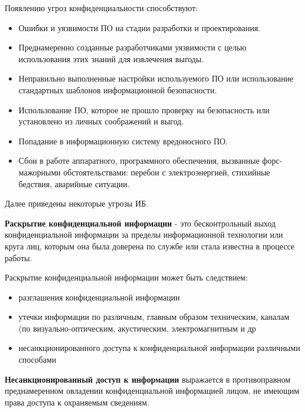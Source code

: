 Появлению угроз конфиденциальности способствуют: 
\begin{itemize}


    \item Ошибки и уязвимости ПО на стадии разработки и проектирования.

    \item Преднамеренно созданные разработчиками уязвимости с целью использования этих знаний для извлечения выгоды.

    \item Неправильно выполненные настройки используемого ПО или использование стандартных шаблонов информационной безопасности.

    \item Использование ПО, которое не прошло проверку на безопасность или установлено из личных соображений и выгод.

    \item Попадание в информационную систему вредоносного ПО.

    \item Сбои в работе аппаратного, программного обеспечения, вызванные форс-мажорными обстоятельствами: перебои с электроэнергией, стихийные бедствия, аварийные ситуации.

\end{itemize}

Далее приведены некоторые угрозы ИБ.

\textbf{Раскрытие конфиденциальной информации} - это бесконтрольный выход конфиденциальной
информации за пределы информационной технологии или круга лиц, которым она была доверена по
службе или стала известна в процессе работы.

Раскрытие конфиденциальной информации может быть следствием:
\begin{itemize}
    \item разглашения конфиденциальной информации
    \item утечки информации по различным, главным образом техническим, каналам
        (по визуально-оптическим, акустическим, электромагнитным и др
    \item несанкционированного доступа к конфиденциальной информации различными способами
\end{itemize}

\textbf{Несанкционированный доступ к информации} выражается в противоправном преднамеренном
овладении конфиденциальной информацией лицом, не имеющим права доступа к охраняемым сведениям.

